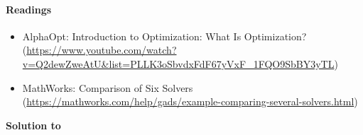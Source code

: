 \paragraph{Readings}
\begin{itemize}
  \item AlphaOpt: Introduction to Optimization: What Is Optimization? (\url{https://www.youtube.com/watch?v=Q2dewZweAtU&list=PLLK3oSbvdxFdF67yVxF_1FQO9SbBY3yTL})
  \item MathWorks: Comparison of Six Solvers (\url{https://mathworks.com/help/gads/example-comparing-several-solvers.html})
\end{itemize}

\begin{solution}\textbf{Solution to }
\ifDisplaySolutions

\fi
\newpage
\end{solution}